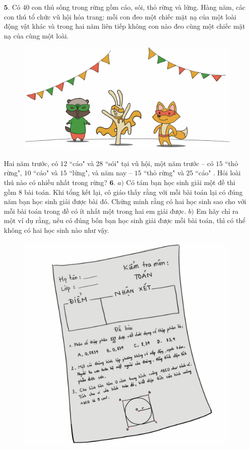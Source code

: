 \begin{multicols}{2}
\begin{figure}[H]
		\vspace*{-20pt}
	\end{figure}
	$\pmb{5.}$ Có $40$ con thú sống trong rừng gồm cáo, sói, thỏ rừng và lửng. Hàng năm, các con thú tổ chức vũ hội hóa trang: mỗi con đeo một chiếc mặt nạ của một loài động vật khác và trong hai năm liên tiếp không con nào đeo cùng một chiếc mặt nạ của cùng một loài.
	\begin{figure}[H]
		\centering
		\vspace*{-5pt}
		\captionsetup{labelformat= empty, justification=centering}
		\includegraphics[width=1\linewidth]{Pi4_bai5}
		\vspace*{-20pt}
	\end{figure}
	Hai năm trước, có $12$ ``cáo" và $28$ ``sói" tại vũ hội, một năm trước -- có $15$ ``thỏ rừng", $10$ ``cáo" và $15$ ``lửng", và năm nay -- $15$ ``thỏ rừng" và $25$ ``cáo" . Hỏi loài thú nào có nhiều nhất trong rừng? 
	\vskip 0.1cm
	$\pmb{6.}$ $a)$	Có tám bạn học sinh giải một đề thi gồm $8$ bài toán. Khi tổng kết lại, cô giáo thấy rằng với mỗi bài toán lại có đúng  năm bạn học sinh giải được bài đó. Chứng minh rằng có hai học sinh sao cho với mỗi bài toán trong đề có ít nhất một trong hai em giải được.
	\vskip 0.1cm
	$b)$	Em hãy chỉ ra một ví dụ rằng, nếu có đúng bốn bạn học sinh giải được mỗi bài toán, thì có thể không có hai  học sinh nào như vậy.
	\begin{figure}[H]
		\centering
		\vspace*{-5pt}
		\captionsetup{labelformat= empty, justification=centering}
		\includegraphics[width=0.7\linewidth]{Pi4_bai6}
		\vspace*{-5pt}
	\end{figure}
\end{multicols}
